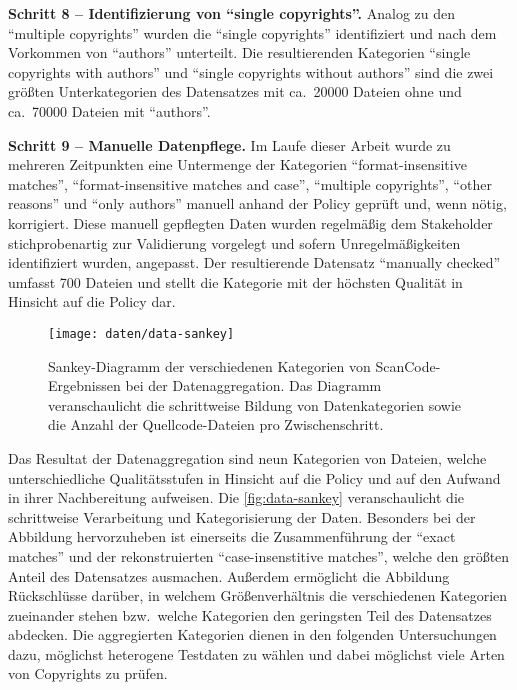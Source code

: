 \textbf{Schritt 8 -- Identifizierung von \enquote{single copyrights}.}
Analog zu den \enquote{multiple copyrights} wurden die \enquote{single copyrights} identifiziert und nach dem Vorkommen von \enquote{authors} unterteilt.
Die resultierenden Kategorien \enquote{single copyrights with authors} und \enquote{single copyrights without authors} sind die zwei größten Unterkategorien des Datensatzes mit ca.\ \num{20000} Dateien ohne und ca.\ \num{70000} Dateien mit \enquote{authors}.

\textbf{Schritt 9 -- Manuelle Datenpflege.}
Im Laufe dieser Arbeit wurde zu mehreren Zeitpunkten eine Untermenge der Kategorien \enquote{format-insensitive matches}, \enquote{format-insensitive matches and case}, \enquote{multiple copyrights}, \enquote{other reasons} und \enquote{only authors} manuell anhand der Policy geprüft und, wenn nötig, korrigiert.
Diese manuell gepflegten Daten wurden regelmäßig dem Stakeholder stichprobenartig zur Validierung vorgelegt und sofern Unregelmäßigkeiten identifiziert wurden, angepasst.
Der resultierende Datensatz \enquote{manually checked} umfasst 700 Dateien und stellt die Kategorie mit der höchsten Qualität in Hinsicht auf die Policy dar.

\begin{figure}[ht]
    \centering
    \texttt{[image: daten/data-sankey]}
    \caption{Sankey-Diagramm der verschiedenen Kategorien von ScanCode-Ergebnissen bei der Datenaggregation. Das Diagramm veranschaulicht die schrittweise Bildung von Datenkategorien sowie die Anzahl der Quellcode-Dateien pro Zwischenschritt.}
    \label{fig:data-sankey}
\end{figure}
Das Resultat der Datenaggregation sind neun Kategorien von Dateien, welche unterschiedliche Qualitätsstufen in Hinsicht auf die Policy und auf den Aufwand in ihrer Nachbereitung aufweisen.
Die \autoref{fig:data-sankey} veranschaulicht die schrittweise Verarbeitung und Kategorisierung der Daten.
Besonders bei der Abbildung hervorzuheben ist einerseits die Zusammenführung der \enquote{exact matches} und der rekonstruierten \enquote{case-insenstitive matches}, welche den größten Anteil des Datensatzes ausmachen.
Außerdem ermöglicht die Abbildung Rückschlüsse darüber, in welchem Größenverhältnis die verschiedenen Kategorien zueinander stehen bzw.\ welche Kategorien den geringsten Teil des Datensatzes abdecken.
Die aggregierten Kategorien dienen in den folgenden Untersuchungen dazu, möglichst heterogene Testdaten zu wählen und dabei möglichst viele Arten von Copyrights zu prüfen.

